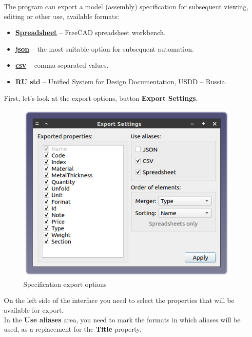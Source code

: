 \documentclass[a4paper,12pt]{article}
\begin{document}
The program can export a model (assembly) specification for subsequent viewing, editing or other use, available formats:
\begin{itemize}
	\item \href{https://wiki.freecad.org/Spreadsheet_Workbench}{\textbf{Spreadsheet}} -- FreeCAD spreadsheet workbench.
	\item \href{https://ru.wikipedia.org/wiki/JSON}{\textbf{json}} -- the most suitable option for subsequent automation.
	\item \href{https://en.wikipedia.org/wiki/Comma-separated_values}{\textbf{csv}} -- comma-separated values.
	\item \textbf{RU std} -- Unified System for Design Documentation, USDD -- Russia.
\end{itemize}

\begin{flushleft}First, let's look at the export options, button \textbf{Export Settings}.\end{flushleft}

\begin{figure}[htp]
	\centering
	\includegraphics[scale=1]{img/specification_export.png}
	\caption{Specification export options}
	\label{sec:specification_export}
\end{figure}

On the left side of the interface you need to select the properties that will be available for export.\\

In the \textbf{Use aliases} area, you need to mark the formats in which aliases will be used, as a replacement for the \textbf{Title} property.\\
\end{document}
